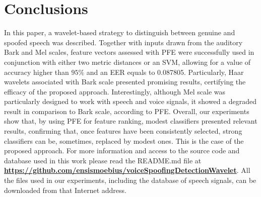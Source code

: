 \section{Conclusions}
\label{sec:conclusions}
\par In this paper, a wavelet-based strategy to distinguish between genuine and spoofed speech was described. Together with inputs drawn  from the auditory Bark and Mel scales, feature vectors assessed with PFE were successfully used in conjunction with either two metric distances or an SVM, allowing for a value of accuracy higher than $95\%$ and an EER equals to 0.087805. Particularly, Haar wavelets associated with Bark scale presented promising results, certifying the efficacy of the proposed approach. Interestingly, although Mel scale was particularly designed to work with speech and voice signals, it showed a degraded result in comparison to Bark scale, according to PFE. Overall, our experiments show that, by using PFE for feature ranking, modest classifiers presented relevant results, confirming that, once features have been consistently selected, strong classifiers can be, sometimes, replaced by modest ones. This is the case of the proposed approach. For more information and access to the source code and database used in this work please read the README.md file at \href{https://github.com/ensismoebius/voiceSpoofingDetectionWavelet}{\textbf{https://github.com/ensismoebius/voiceSpoofingDetectionWavelet}}. All the files used in our experiments, including the database of speech signals, can be downloaded from that Internet address. 
